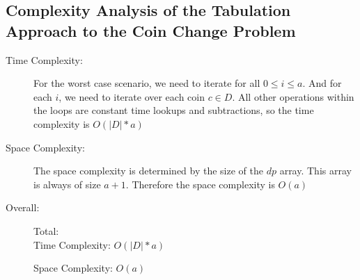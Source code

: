 \subsection{Complexity Analysis of the Tabulation Approach to the Coin Change Problem}

\begin{description}
    \item[Time Complexity:]
        For the worst case scenario, we need to iterate for all $0 \leq i \leq a$.
        And for each $i$, we need to iterate over each coin $c \in D$.
        All other operations within the loops are constant time lookups and subtractions, so the time complexity is $O(|D| * a)$
            
    \item[Space Complexity:] 
        The space complexity is determined by the size of the $dp$ array. This array is always of size $a+1$.
        Therefore the space complexity is $O(a)$
        
    \item[Overall:] Total:\\
        Time Complexity: $O(|D| * a)$

        Space Complexity: $O(a)$
        
\end{description}